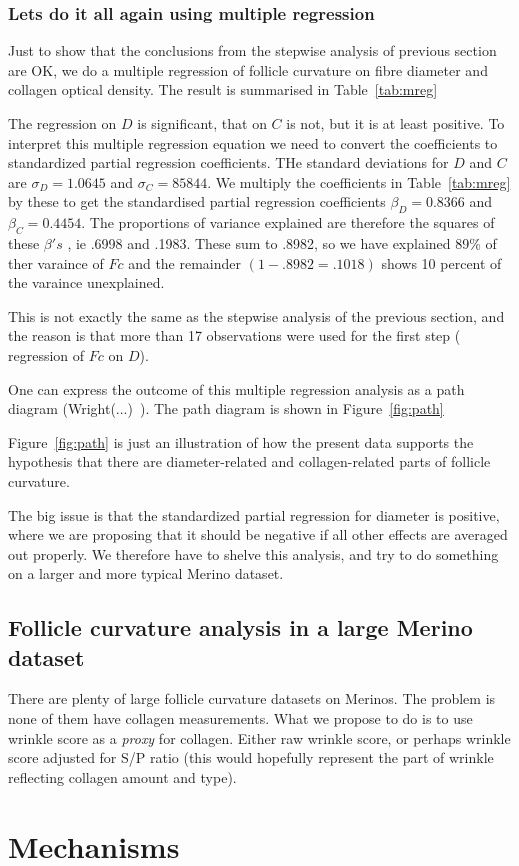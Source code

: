 \documentclass{article}
\begin{document}
\begin{tiny}
\subsubsection{ Lets do it all again using multiple regression}
Just to show that the conclusions from the stepwise analysis of previous section are OK, we do a multiple regression of follicle curvature  on fibre diameter and collagen optical density. The result is summarised in Table~\ref{tab:mreg}

The regression on $D$ is significant, that on $C$ is not, but it is at least positive. To interpret this multiple regression equation we need to convert the coefficients to standardized partial regression coefficients. THe standard deviations for $D$ and $C$ are $\sigma_{D} = 1.0645$ and $\sigma_{C} = 85844$. We multiply the coefficients in Table~\ref{tab:mreg} by these to get the standardised partial regression coefficients $\beta_{D} = 0.8366$ and $\beta_{C} = 0.4454$. The proportions of variance explained are therefore the squares of these $\beta's$ , ie .6998 and .1983. These sum to .8982, so we have explained 89\% of ther varaince of $Fc$ and the remainder $(1-.8982 = .1018)$ shows 10 percent of the varaince unexplained.

This is not exactly the same as the stepwise analysis of the previous section, and the reason is that more than 17 observations were used for the first step ( regression of $Fc$ on $D$). 

One can express the outcome of this multiple regression analysis as a path diagram (Wright(...)~\cite{wright-}). The path diagram is shown in Figure~\ref{fig:path}

Figure~\ref{fig:path} is just an illustration of how the present data supports the hypothesis that there are diameter-related and collagen-related parts of follicle curvature. 

The big issue is that the standardized partial regression for diameter is positive, where we are proposing that it should be negative if all other effects are averaged out properly.  We therefore have to shelve this analysis, and try to do something on a larger and more typical Merino dataset.

\end{tiny}

\subsection{ Follicle curvature analysis in a large Merino dataset}
 There are plenty of large follicle curvature datasets on Merinos. The problem is none of them have collagen measurements. What we propose to do is to use wrinkle score as a {\em proxy} for collagen. Either raw wrinkle score, or perhaps wrinkle score adjusted for S/P ratio (this would hopefully represent the part of wrinkle reflecting collagen amount and type).

\section{Mechanisms}




\end{document}
